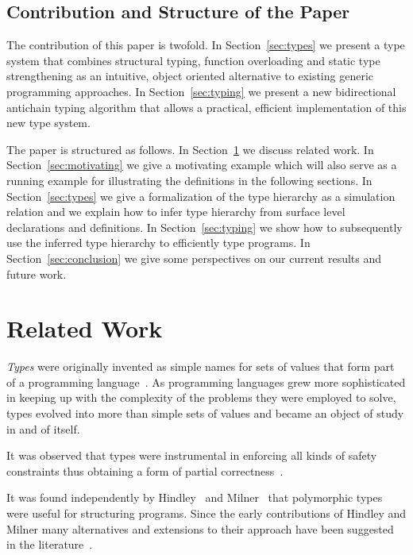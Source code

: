 \documentclass{sigplanconf}
\newcommand{\concept}[1]{\emph{#1}}
\begin{document}
\subsection{Contribution and Structure of the Paper}

The contribution of this paper is twofold. In Section~\ref{sec:types}
we present a type system that combines structural typing, function
overloading and static type strengthening as an intuitive, object
oriented alternative to existing generic programming approaches. In
Section~\ref{sec:typing} we present a new bidirectional antichain
typing algorithm that allows a practical, efficient implementation of
this new type system.

The paper is structured as follows.  In Section~\ref{sec:related} we
discuss related work. In Section~\ref{sec:motivating} we give a
motivating example which will also serve as a running example for
illustrating the definitions in the following sections. In
Section~\ref{sec:types} we give a formalization of the type hierarchy
as a simulation relation and we explain how to infer type hierarchy
from surface level declarations and definitions. In
Section~\ref{sec:typing} we show how to subsequently use the inferred
type hierarchy to efficiently type programs. In
Section~\ref{sec:conclusion} we give some perspectives on our current
results and future work.

\section{Related Work}\label{sec:related}

\concept{Types} were originally invented as simple names for sets of
values that form part of a programming language~\cite{Naur1963}. As
programming languages grew more sophisticated in keeping up with the
complexity of the problems they were employed to solve, types evolved
into more than simple sets of values and became an object of study in
and of itself. 

It was observed that types were instrumental in enforcing all kinds of
safety constraints thus obtaining a form of partial
correctness~\cite{Middleton1977,Cardelli1985}.

It was found independently by Hindley~\cite{Hindley1969} and
Milner~\cite{Milner1978} that polymorphic types were useful for
structuring programs.  Since the early contributions of Hindley and
Milner many alternatives and extensions to their approach have been
suggested in the literature~\cite{Schwartz1975,Schonberg1981,Palsberg1992,Aiken1993,Eifrig1995,Aiken1997}.
\end{document}
